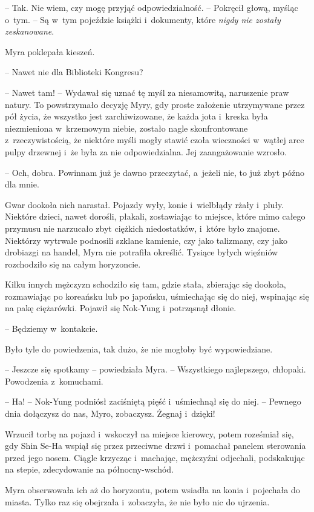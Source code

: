 \documentclass[oneside,polish,11pt,sfheadings]{mwbk}
\begin{document}
-- Tak. Nie wiem, czy mogę przyjąć odpowiedzialność. -- Pokręcił głową,
myśląc o~tym. -- Są w~tym pojeździe książki i~dokumenty, które
\textit{nigdy nie zostały zeskanowane}.

Myra poklepała kieszeń. 

-- Nawet nie dla Biblioteki Kongresu?

-- Nawet tam! -- Wydawał się uznać tę myśl za niesamowitą, naruszenie praw
natury. To powstrzymało decyzję Myry, gdy proste założenie utrzymywane
przez pół życia, że wszystko jest zarchiwizowane, że każda jota i~kreska
była niezmieniona w~krzemowym niebie, zostało nagle skonfrontowane z~rzeczywistością, że niektóre myśli mogły stawić czoła wieczności w~wątłej arce pulpy drzewnej i~że była za nie odpowiedzialna. Jej zaangażowanie wzrosło.

-- Och, dobra. Powinnam już je dawno przeczytać, a~jeżeli nie, to już
zbyt późno dla mnie.

Gwar dookoła nich narastał. Pojazdy wyły, konie i~wielbłądy rżały i~pluły. Niektóre dzieci, nawet dorośli, płakali, zostawiając to miejsce,
które mimo całego przymusu nie narzucało zbyt ciężkich niedostatków, i~które było znajome. Niektórzy wytrwale podnosili szklane kamienie, czy
jako talizmany, czy jako drobiazgi na handel, Myra nie potrafiła
określić. Tysiące byłych więźniów rozchodziło się na całym horyzoncie.

Kilku innych mężczyzn schodziło się tam, gdzie stała, zbierając się
dookoła, rozmawiając po koreańsku lub po japońsku, uśmiechając się do
niej, wspinając się na pakę ciężarówki. Pojawił się Nok-Yung i~potrząsnął dłonie.

-- Będziemy w~kontakcie.

Było tyle do powiedzenia, tak dużo, że nie mogłoby być wypowiedziane.

-- Jeszcze się spotkamy -- powiedziała Myra. -- Wszystkiego najlepszego,
chłopaki. Powodzenia z~komuchami.

-- Ha! -- Nok-Yung podniósł zaciśniętą pięść i~uśmiechnął się do niej. -- Pewnego dnia dołączysz do nas, Myro, zobaczysz. Żegnaj i~dzięki!

Wrzucił torbę na pojazd i~wskoczył na miejsce kierowcy, potem roześmiał
się, gdy Shin Se-Ha wspiął się przez przeciwne drzwi i~pomachał panelem
sterowania przed jego nosem. Ciągle krzycząc i~machając, mężczyźni
odjechali, podskakując na stepie, zdecydowanie na północny-wschód.

Myra obserwowała ich aż do horyzontu, potem wsiadła na konia i~pojechała
do miasta. Tylko raz się obejrzała i~zobaczyła, że nie było nic do
ujrzenia.
\end{document}

